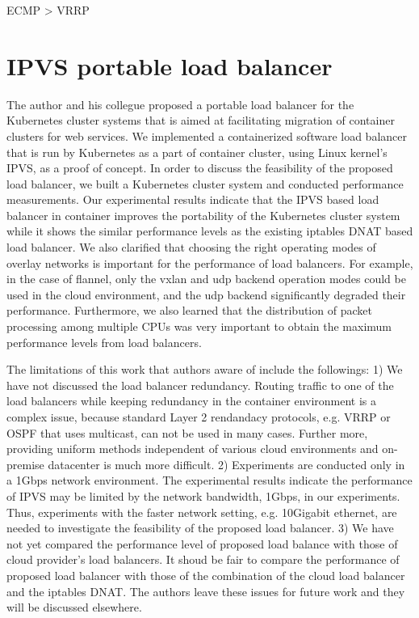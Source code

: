 ECMP > VRRP


\section{IPVS portable load balancer}\label{IPVS}


The author and his collegue proposed a portable load balancer for the Kubernetes cluster systems 
that is aimed at facilitating migration of container clusters for web services.
We implemented a containerized software load balancer that is run by Kubernetes as a part of container cluster, 
using Linux kernel's IPVS, as a proof of concept.
In order to discuss the feasibility of the proposed load balancer, we built 
a Kubernetes cluster system and conducted performance measurements.
Our experimental results indicate that the IPVS based load balancer in container improves the portability of 
the Kubernetes cluster system while it shows the similar performance levels as the existing iptables DNAT based load balancer.
We also clarified that choosing the right operating modes of overlay networks is important for the performance of load balancers. 
For example, in the case of flannel, only the vxlan and udp backend operation modes could be used 
in the cloud environment, and the udp backend significantly degraded their performance.
Furthermore, we also learned that the distribution of packet processing among multiple CPUs was very important
to obtain the maximum performance levels from load balancers.
%

The limitations of this work that authors aware of include the followings: 
1) We have not discussed the load balancer redundancy. 
Routing traffic to one of the load balancers while keeping redundancy in the container environment is a complex issue,
because standard Layer 2 rendandacy protocols, e.g. VRRP or OSPF\cite{moy1997ospf} that uses multicast, can not be used in many cases.
Further more, providing uniform methods independent of various cloud environments and on-premise datacenter is much more difficult.   
2) Experiments are conducted only in a 1Gbps network environment.
The experimental results indicate the performance of IPVS may be limited by the network bandwidth, 1Gbps, in our experiments. 
Thus, experiments with the faster network setting, e.g. 10Gigabit ethernet, are needed to investigate the feasibility of the proposed load balancer.
3) We have not yet compared the performance level of proposed load balance with those of cloud provider's load balancers.
It shoud be fair to compare the performance of proposed load balancer with those of the combination of the cloud load balancer and the iptables DNAT. 
The authors leave these issues for future work and they will be discussed elsewhere.


